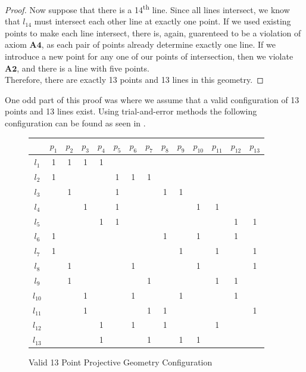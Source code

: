 \documentclass{article}
\begin{document}
\begin{proof}
Now suppose that there is a 14\textsuperscript{th} line. Since all lines intersect, we know that $l_{14}$ must intersect each other line at exactly one point. If we used existing points to make each line intersect, there is, again, guarenteed to be a violation of axiom $\mathbf{A4}$, as each pair of points already determine exactly one line. If we introduce a new point for any one of our points of intersection, then we violate $\mathbf{A2}$, and there is a line with five points.\\

Therefore, there are exactly 13 points and 13 lines in this geometry.
 \end{proof}
 
 One odd part of this proof was where we assume that a valid configuration of 13 points and 13 lines exist. Using trial-and-error methods the following configuration can be found as seen in .
\begin{figure}[h]
\caption{Valid 13 Point Projective Geometry Configuration}
\begin{center}
\begin{tabular}{ c|c|c|c|c|c|c|c|c|c|c|c|c|c } 
 
  & $p_1$ & $p_2$ & $p_3$ &$p_4$ &$p_5$ &$p_6$ &$p_7$ &$p_8$ &$p_9$  &$p_{10}$&$p_{11}$&$p_{12}$&$p_{13}$ \\ 
\hline
 $l_1$ & 1 & 1 & 1 & 1 &  &&& &&&&& \\ 
 \hline
 $l_2$ & 1 & &&&1&1&1&&&&&& \\
 \hline
 $l_3$ & &1&&&1&&&1&1&&&&\\
 \hline
 $l_4$ &  &  & 1 &  &1 & &&&&1&1&&\\
 \hline
 $l_5$ & &&&1&1&&&&&&&1&1\\
 \hline
 $l_6$ &1&&&&&&&1&&1&&1& \\
 \hline
 $l_7$ &1&&&&&&&&1&&1&&1\\
 \hline
 $l_8$ &&1&&&&1&&&&1&&&1\\
 \hline
 $l_9$ &&1&&&&&1&&&&1&1&\\
 \hline
 $l_{10}$ &&&1&&&1&&&1&&&1&\\
 \hline
 $l_{11}$ &&&1&&&&1&1&&&&&1\\
 \hline
 $l_{12}$&&&&1&&1&&1&&&1&&\\
 \hline
 $l_{13}$ &&&&1&&&1&&1&1&&& 

\end{tabular}
\end{center}
\end{figure}
\end{document}
